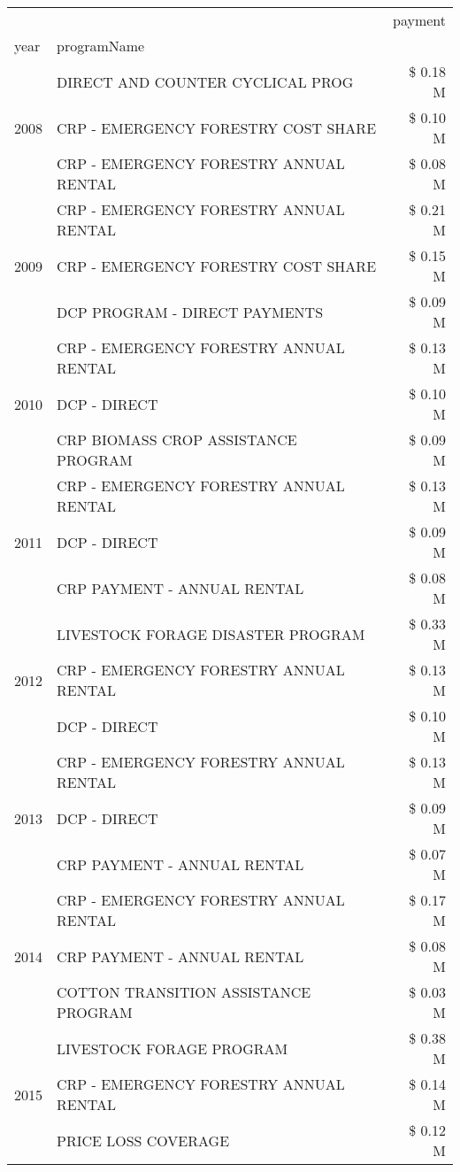 \begin{tabular}{llr}
\toprule
 &  & payment \\
year & programName &  \\
\midrule
\multirow[t]{3}{*}{2008} & DIRECT AND COUNTER CYCLICAL PROG & \$ 0.18 M \\
 & CRP - EMERGENCY FORESTRY COST SHARE & \$ 0.10 M \\
 & CRP - EMERGENCY FORESTRY ANNUAL RENTAL & \$ 0.08 M \\
\cline{1-3}
\multirow[t]{3}{*}{2009} & CRP - EMERGENCY FORESTRY ANNUAL RENTAL & \$ 0.21 M \\
 & CRP - EMERGENCY FORESTRY COST SHARE & \$ 0.15 M \\
 & DCP PROGRAM - DIRECT PAYMENTS & \$ 0.09 M \\
\cline{1-3}
\multirow[t]{3}{*}{2010} & CRP - EMERGENCY FORESTRY ANNUAL RENTAL & \$ 0.13 M \\
 & DCP - DIRECT & \$ 0.10 M \\
 & CRP BIOMASS CROP ASSISTANCE PROGRAM & \$ 0.09 M \\
\cline{1-3}
\multirow[t]{3}{*}{2011} & CRP - EMERGENCY FORESTRY ANNUAL RENTAL & \$ 0.13 M \\
 & DCP - DIRECT & \$ 0.09 M \\
 & CRP PAYMENT - ANNUAL RENTAL & \$ 0.08 M \\
\cline{1-3}
\multirow[t]{3}{*}{2012} & LIVESTOCK FORAGE DISASTER PROGRAM & \$ 0.33 M \\
 & CRP - EMERGENCY FORESTRY ANNUAL RENTAL & \$ 0.13 M \\
 & DCP - DIRECT & \$ 0.10 M \\
\cline{1-3}
\multirow[t]{3}{*}{2013} & CRP - EMERGENCY FORESTRY ANNUAL RENTAL & \$ 0.13 M \\
 & DCP - DIRECT & \$ 0.09 M \\
 & CRP PAYMENT - ANNUAL RENTAL & \$ 0.07 M \\
\cline{1-3}
\multirow[t]{3}{*}{2014} & CRP - EMERGENCY FORESTRY ANNUAL RENTAL & \$ 0.17 M \\
 & CRP PAYMENT - ANNUAL RENTAL & \$ 0.08 M \\
 & COTTON TRANSITION ASSISTANCE PROGRAM & \$ 0.03 M \\
\cline{1-3}
\multirow[t]{3}{*}{2015} & LIVESTOCK FORAGE PROGRAM & \$ 0.38 M \\
 & CRP - EMERGENCY FORESTRY ANNUAL RENTAL & \$ 0.14 M \\
 & PRICE LOSS COVERAGE & \$ 0.12 M \\

\end{tabular}
